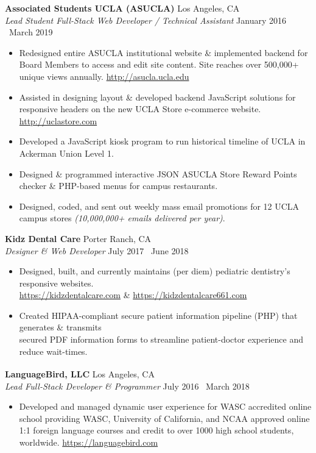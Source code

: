 \documentclass[margin]{res}
\begin{document}
\begin{resume}
		{\bf Associated Students UCLA (ASUCLA)} \hfill Los Angeles, CA \\
		{\it Lead Student Full-Stack Web Developer / Technical Assistant} \hfill January 2016 \textendash\ March 2019
		\begin{itemize} \itemsep -2pt
			\item Redesigned entire ASUCLA institutional website \& implemented backend for Board Members to access and edit site content. Site reaches over 500,000+ unique views annually. \textcolor{RoyalBlue}{\url{http://asucla.ucla.edu}}
			\item Assisted in designing layout \& developed backend JavaScript solutions for responsive headers on the new UCLA Store e-commerce website. \textcolor{RoyalBlue}{\url{http://uclastore.com}}
			\item Developed a JavaScript kiosk program to run historical timeline of UCLA in Ackerman Union Level 1.
			\item Designed \& programmed interactive JSON ASUCLA Store Reward Points checker \& PHP-based menus for campus restaurants.
			\item Designed, coded, and sent out weekly mass email promotions for 12 UCLA campus stores {\it (10,000,000+ emails delivered per year)}.
		\end{itemize}
		
		{\bf Kidz Dental Care} \hfill Porter Ranch, CA \\
		{\it Designer \& Web Developer} \hfill July 2017 \textendash\ June 2018
		\begin{itemize} \itemsep -2pt
			\item Designed, built, and currently maintains (per diem) pediatric dentistry's responsive websites. \\ \textcolor{RoyalBlue}{\url{https://kidzdentalcare.com}} \& \textcolor{RoyalBlue}{\url{https://kidzdentalcare661.com}}
			\item Created HIPAA-compliant secure patient information pipeline (PHP) that generates \& transmits \\ secured PDF information forms to streamline patient-doctor experience and reduce wait-times.
		\end{itemize}
		\vspace{0.02cm} 
		{\bf LanguageBird\textsuperscript{\textregistered}, LLC} \hfill Los Angeles, CA \\
		{\it Lead Full-Stack Developer \& Programmer} \hfill July 2016 \textendash\ March 2018
		\begin{itemize} \itemsep -2pt
			\item Developed and managed dynamic user experience for WASC accredited online school providing WASC, University of California, and NCAA approved online 1:1 foreign language courses and credit to over 1000 high school students, worldwide. \textcolor{RoyalBlue}{\url{https://languagebird.com}}
		\end{itemize}
		

\end{resume}
\end{document}
